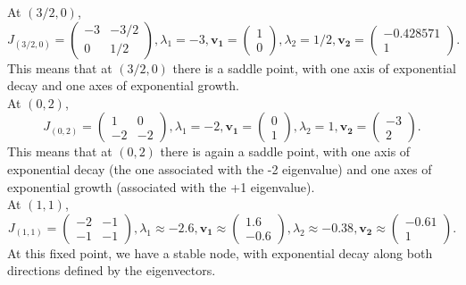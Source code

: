 \documentclass[11pt,answers]{exam}
\begin{document}
\begin{questions}
\begin{solution}
At $(3/2,0)$,  
\begin{equation}J_{(3/2,0)} = 
\begin{pmatrix}
-3 & -3/2\\ 
0 & 1/2
\end{pmatrix}, \lambda_{1} = -3, 
\mathbf{v_{1}} = \begin{pmatrix}
 1\\ 
 0
\end{pmatrix},
\lambda_{2} = 1/2,
\mathbf{v_{2}} = \begin{pmatrix}
 - 0.428571\\ 
 1
\end{pmatrix}.
\end{equation}
This means that at $(3/2,0)$ there is a saddle point, with one axis of exponential decay and one axes of exponential growth. \\

At $(0,2)$,  
\begin{equation}J_{(0,2)} = 
\begin{pmatrix}
1 & 0\\ 
-2 & -2
\end{pmatrix}, \lambda_{1} = -2, 
\mathbf{v_{1}} = \begin{pmatrix}
 0\\ 
 1
\end{pmatrix},
\lambda_{2} = 1,
\mathbf{v_{2}} = \begin{pmatrix}
 - 3\\ 
 2
\end{pmatrix}.
\end{equation}
This means that at $(0,2)$ there is again a saddle point, with one axis of exponential decay (the one associated with the -2 eigenvalue) and one axes of exponential growth (associated with the +1 eigenvalue). \\

At $(1,1)$,  
\begin{equation}J_{(1,1)} = 
\begin{pmatrix}
-2 & -1\\ 
-1 & -1
\end{pmatrix}, \lambda_{1} \approx -2.6, 
\mathbf{v_{1}} \approx \begin{pmatrix}
 1.6\\ 
 -0.6
\end{pmatrix},
\lambda_{2} \approx -0.38,
\mathbf{v_{2}} \approx \begin{pmatrix}
 - 0.61\\ 
 1
\end{pmatrix}.
\end{equation}
At this fixed point, we have a stable node, with exponential decay along both directions defined by the eigenvectors. \\


\end{solution}
\end{questions}
\end{document}

